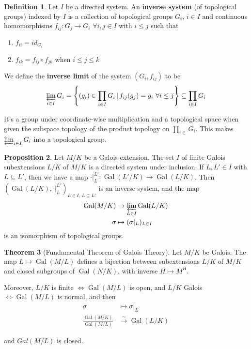 \documentclass[a4paper]{article}
\theoremstyle{definition}
\newtheorem{definition}{Definition}
\theoremstyle{default}
\newtheorem{theorem}[definition]{Theorem}
\newtheorem{prop}[definition]{Proposition}
\theoremstyle{remark}
\DeclareMathOperator{\Gal}{Gal}
\begin{document}
\begin{definition}
	Let $I$ be a directed system.
	An \textbf{inverse system} (of topological groups) indexed by $I$
	is a collection of topological groups $G_i$, $i \in I$
	and continuous homomorphisms $f_{ij}: G_j \to G_i$ $\forall i,j \in I$ with $i \leq j$ such that
	\begin{enumerate}
		\item $f_{ii} = id_{G_i}$
		\item $f_{ik} = f_{ij} \circ f_{jk}$ when $i \leq j \leq k$
	\end{enumerate}
	We define the \textbf{inverse limit} of the system $(G_i, f_{ij})$ to be
	$$ \varprojlim_{i \in I} G_i = \left\{(g_i) \in \prod_{i \in I} G_i \,|\, f_{ij}(g_j) = g_i\ \forall i \leq j \right\} \subseteq \prod_{i \in I} G_i $$
	
	It's a group under coordinate-wise multiplication and a topological space when given the subspace topology of the product topology on $\prod_{i \in} G_i$.
	This makes $\varprojlim_{i \in I} G_i$ into a topological group.
\end{definition}

\begin{prop}
	Let $M/K$ be a Galois extension.
	The set $I$ of finite Galois subextensions $L/K$ of $M/K$ is a directed system under inclusion.
	If $L, L' \in I$ with $L \subseteq L'$,
	then we have a map $\cdot|_L^{L'}: \Gal(L'/K) \to \Gal(L/K)$.
	Then $(\Gal(L/K), \cdot|_L^{L'})_{L \in I,\, L \subseteq L'}$ is an inverse system,
	and the map
	\begin{align*}
		\Gal(M/K) & \to \varprojlim_{L \in I} \Gal(L/K) \\
		\sigma &\mapsto (\sigma|_L)_{L \in I}
	\end{align*}
	is an isomorphism of topological groups.
\end{prop}

\begin{theorem}[Fundamental Theorem of Galois Theory]
	Let $M/K$ be Galois.
	The map $L \mapsto \Gal(M/L)$ defines a bijection between subextensions $L/K$ of $M/K$ and closed subgroups of $\Gal(N/K)$,
	with inverse $H \mapsto M^H$.
	
	Moreover, $L/K$ is finite $\iff \Gal(M/L)$ is open,
	and $L/K$ Galois $\iff \Gal(M/L)$ is normal, and then
	\begin{align*}
		\sigma &\mapsto \sigma|_L \\
		\frac{\Gal(M/K)}{\Gal(M/L)} &\overset{\sim}{\to} \Gal(L/K)
	\end{align*}
	
	and $Gal(M/L)$ is closed.
\end{theorem}
\end{document}
